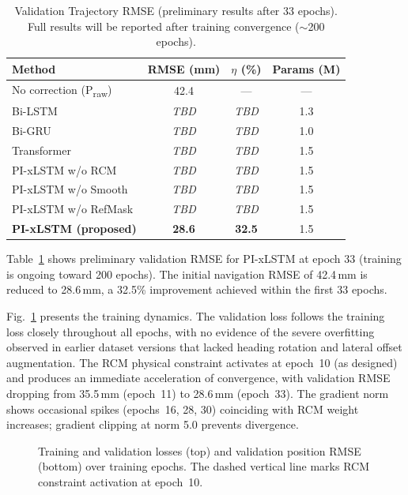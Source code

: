 \documentclass[conference]{IEEEtran}
\begin{document}
\begin{table}[t]
  \centering
  \caption{Validation Trajectory RMSE (preliminary results after 33 epochs).
           Full results will be reported after training convergence
           ($\sim$200 epochs).}
  \label{tab:results}
  \begin{tabular}{lccc}
    \toprule
    Method & RMSE (mm) & $\eta$ (\%) & Params (M) \\
    \midrule
    No correction (P\textsubscript{raw}) & 42.4 & — & — \\
    \midrule
    Bi-LSTM              & \textit{TBD} & \textit{TBD} & 1.3 \\
    Bi-GRU               & \textit{TBD} & \textit{TBD} & 1.0 \\
    Transformer          & \textit{TBD} & \textit{TBD} & 1.5 \\
    \midrule
    PI-xLSTM w/o RCM     & \textit{TBD} & \textit{TBD} & 1.5 \\
    PI-xLSTM w/o Smooth  & \textit{TBD} & \textit{TBD} & 1.5 \\
    PI-xLSTM w/o RefMask & \textit{TBD} & \textit{TBD} & 1.5 \\
    \midrule
    \textbf{PI-xLSTM (proposed)} & \textbf{28.6} & \textbf{32.5} & 1.5 \\
    \bottomrule
  \end{tabular}
\end{table}

Table~\ref{tab:results} shows preliminary validation RMSE
for PI-xLSTM at epoch 33 (training is ongoing toward 200 epochs).
The initial navigation RMSE of 42.4\,mm is reduced to 28.6\,mm,
a 32.5\% improvement achieved within the first 33 epochs.

Fig.~\ref{fig:curves} presents the training dynamics.
The validation loss follows the training loss closely throughout all epochs,
with no evidence of the severe overfitting observed in earlier dataset versions
that lacked heading rotation and lateral offset augmentation.
The RCM physical constraint activates at epoch~10 (as designed) and
produces an immediate acceleration of convergence, with
validation RMSE dropping from 35.5\,mm (epoch~11) to 28.6\,mm (epoch~33).
The gradient norm shows occasional spikes (epochs~16, 28, 30) coinciding with
RCM weight increases; gradient clipping at norm 5.0 prevents divergence.

\begin{figure}[t]
  \centering
  \caption{Training and validation losses (top) and validation position RMSE
           (bottom) over training epochs. The dashed vertical line marks
           RCM constraint activation at epoch~10.}
  \label{fig:curves}
\end{figure}
\end{document}

